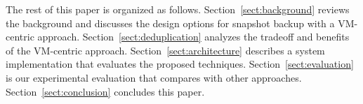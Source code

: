 
The rest of this paper is organized as follows.
Section~\ref{sect:background} reviews the background and discusses the  design options for snapshot backup 
with a VM-centric approach. 
Section~\ref{sect:deduplication}  analyzes the tradeoff and benefits of the VM-centric approach. 
Section~\ref{sect:architecture}  describes a system implementation that evaluates the proposed techniques.
Section~\ref{sect:evaluation} is our experimental evaluation that compares with other approaches.
Section~\ref{sect:conclusion}  concludes this paper.
